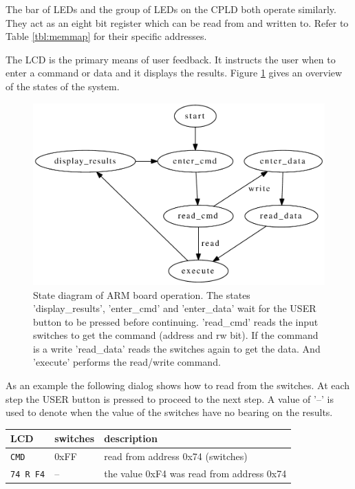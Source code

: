 \documentclass{article}
\begin{document}
The bar of LEDs and the group of LEDs on the CPLD both operate
similarly.
They act as an eight bit register which can be read from and written to.
Refer to Table \ref{tbl:memmap} for their specific addresses.

The LCD is the primary means of user feedback.
It instructs the user when to enter a command or data and
it displays the results.
Figure \ref{fig:armstate} gives an overview of the states of
the system.

\begin{figure}[hbp]
\center
\includegraphics[scale=0.8]{figures/arm-state_diagram/arm-state_diagram}
\caption{State diagram of ARM board operation.
The states 'display\_results', 'enter\_cmd' and 'enter\_data'
wait for the USER button to be pressed before continuing.
'read\_cmd' reads the input switches to get the command (address and rw bit).
If the command is a write 'read\_data' reads the switches again to get the data.
And 'execute' performs the read/write command.
}
\label{fig:armstate}
\end{figure}

As an example the following dialog shows how to read from
the switches.
At each step the USER button is pressed to proceed to the next step.
A value of '--' is used to denote when the value of the switches have
no bearing on the results.

\begin{tabular}{l l l}
LCD & switches & description \\
\hline
\verb+CMD+ & 0xFF & read from address 0x74 (switches) \\
\verb+74 R F4+ & -- & the value 0xF4 was read from address 0x74 \\
\end{tabular}
\end{document}
